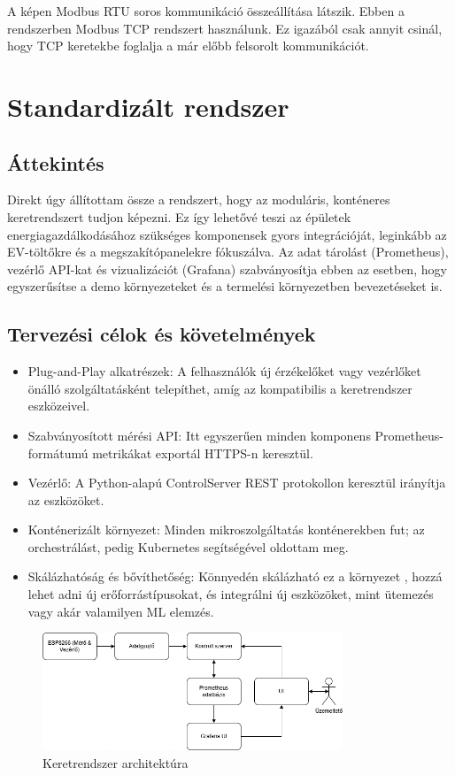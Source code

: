 A képen Modbus RTU soros kommunikáció összeállítása látszik. Ebben a rendszerben Modbus TCP rendszert használunk.
Ez igazából csak annyit csinál, hogy TCP keretekbe foglalja a már előbb felsorolt kommunikációt.

\section{Standardizált rendszer}

\subsection{Áttekintés}

Direkt úgy állítottam össze a rendszert, hogy az moduláris, konténeres keretrendszert tudjon képezni. 
Ez így lehetővé teszi az épületek energiagazdálkodásához szükséges komponensek gyors integrációját, 
leginkább az EV-töltőkre és a megszakítópanelekre fókuszálva. Az adat tárolást (Prometheus), 
vezérlő API-kat és vizualizációt (Grafana) szabványosítja ebben az esetben, hogy egyszerűsítse a 
demo környezeteket és a termelési környezetben bevezetéseket is.

\subsection{Tervezési célok és követelmények}

\begin{itemize}
    \item Plug-and-Play alkatrészek: A felhasználók új érzékelőket vagy vezérlőket önálló szolgáltatásként telepíthet, 
    amíg az kompatibilis a keretrendszer eszközeivel.
    \item Szabványosított mérési API: Itt egyszerűen minden komponens Prometheus-formátumú metrikákat exportál HTTPS-n 
    keresztül.
    \item Vezérlő: A Python-alapú ControlServer REST protokollon keresztül irányítja az eszközöket.
    \item Konténerizált környezet: Minden mikroszolgáltatás konténerekben fut; az orchestrálást, 
    pedig Kubernetes segítségével oldottam meg.
    \item Skálázhatóság és bővíthetőség: Könnyedén skálázható ez a környezet , hozzá lehet adni új erőforrástípusokat, 
    és integrálni új eszközöket, mint ütemezés vagy akár valamilyen ML elemzés.
\end{itemize}

\begin{figure}[!ht]
    \centering
    \includegraphics[width=0.8\textwidth, keepaspectratio]{figures/framework.png}
    \caption{Keretrendszer architektúra}
\end{figure}

